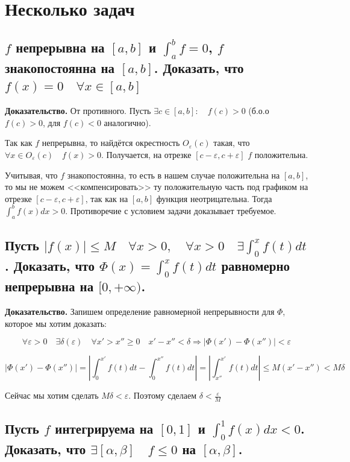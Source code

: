 \documentclass[a4paper]{article}
\begin{document}
\hypertarget{tasks}{}
\section*{Несколько задач}

\subsection{$f$ непрерывна на $[a,b]$ и $\int_a^b f = 0$, $f$ знакопостоянна на $[a,b]$. Доказать, что $f(x)=0 \quad \forall x \in [a,b]$}

\textbf{Доказательство.} От противного. Пусть $\exists c \in [a,b]: \quad f(c)>0$ (б.о.о $f(c)>0$, для $f(c) < 0$ аналогично).

Так как $f$ непрерывна, то найдётся окрестность $O_{\varepsilon}(c)$ такая, что $\forall x \in O_{\varepsilon}(c) \quad f(x) > 0$. Получается, на отрезке $[c-\varepsilon, c+\varepsilon]$ $f$ положительна. 

Учитывая, что $f$ знакопостоянна, то есть в нашем случае положительна на $[a,b]$, то мы не можем <<компенсировать>> ту положительную часть под графиком на отрезке $[c-\varepsilon, c+\varepsilon]$, так как на $[a,b]$ функция неотрицательна. Тогда $\int_a^b f(x)dx > 0$. Противоречие с условием задачи доказывает требуемое.

\subsection{Пусть $|f(x)| \leq M \quad \forall x > 0, \quad \forall x > 0 \quad \exists \int_0^x f(t)dt$. Доказать, что $\Phi(x) = \int_0^x f(t)dt$ равномерно непрерывна на $[0, +\infty)$.}

\textbf{Доказательство.}
Запишем определение равномерной непрерывности для $\Phi$, которое мы хотим доказать:

\[
\forall \varepsilon > 0 \quad \exists \delta(\varepsilon) \quad \forall x' > x'' \geq 0 \quad x'-x''<\delta \Rightarrow |\Phi(x') - \Phi(x'')| < \varepsilon
\]

\[
|\Phi(x') - \Phi(x'')| = \left| \int_0^{x'} f(t)dt - \int_0^{x''} f(t)dt \right| = \left| \int_{x''}^{x'} f(t)dt \right| \leq M(x'-x'') < M\delta 
\]

Сейчас мы хотим сделать $M\delta < \varepsilon$. Поэтому сделаем $\delta < \frac{\varepsilon}{M}$

\subsection{Пусть $f$ интегрируема на $[0,1]$ и $\int_0^1 f(x)dx < 0$. Доказать, что $\exists [\alpha, \beta] \quad f \leq 0$ на $[\alpha, \beta]$.}
\end{document}
